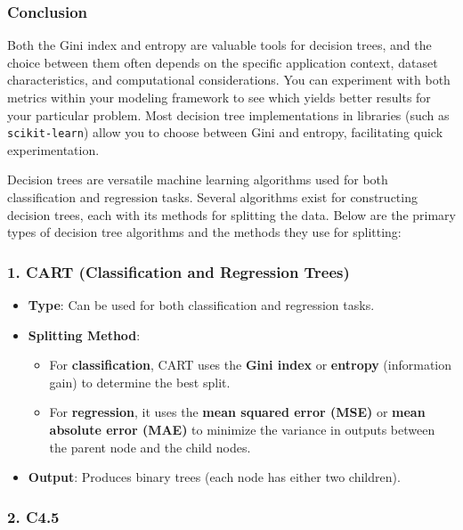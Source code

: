 \documentclass[12pt]{book}
\providecommand{\tightlist}{%
  \setlength{\itemsep}{0pt}\setlength{\parskip}{0pt}}
\begin{document}
\subsubsection{Conclusion}\label{conclusion-1}

Both the Gini index and entropy are valuable tools for decision trees,
and the choice between them often depends on the specific application
context, dataset characteristics, and computational considerations. You
can experiment with both metrics within your modeling framework to see
which yields better results for your particular problem. Most decision
tree implementations in libraries (such as \texttt{scikit-learn}) allow
you to choose between Gini and entropy, facilitating quick
experimentation.

Decision trees are versatile machine learning algorithms used for both
classification and regression tasks. Several algorithms exist for
constructing decision trees, each with its methods for splitting the
data. Below are the primary types of decision tree algorithms and the
methods they use for splitting:

\subsubsection{1. CART (Classification and Regression
Trees)}\label{cart-classification-and-regression-trees}

\begin{itemize}
\tightlist
\item
  \textbf{Type}: Can be used for both classification and regression
  tasks.
\item
  \textbf{Splitting Method}:

  \begin{itemize}
  \tightlist
  \item
    For \textbf{classification}, CART uses the \textbf{Gini index} or
    \textbf{entropy} (information gain) to determine the best split.
  \item
    For \textbf{regression}, it uses the \textbf{mean squared error
    (MSE)} or \textbf{mean absolute error (MAE)} to minimize the
    variance in outputs between the parent node and the child nodes.
  \end{itemize}
\item
  \textbf{Output}: Produces binary trees (each node has either two
  children).
\end{itemize}

\subsubsection{2. C4.5}\label{c4.5}
\end{document}
